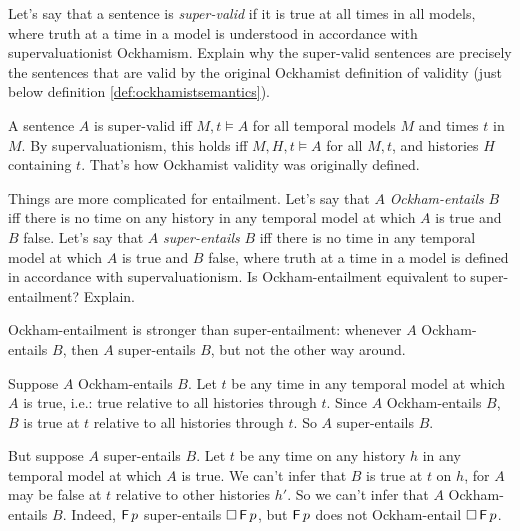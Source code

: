 \begin{exercise}
  Let's say that a sentence is \emph{super-valid} if it is true at all times in
  all models, where truth at a time in a model is understood in accordance with
  supervaluationist Ockhamism. Explain why the super-valid sentences are
  precisely the sentences that are valid by the original Ockhamist definition of
  validity (just below definition \ref{def:ockhamistsemantics}).
\end{exercise}
\begin{solution}
  A sentence $A$ is super-valid iff $M,t \models A$ for all temporal models $M$
  and times $t$ in $M$. By supervaluationism, this holds iff $M,H,t \models A$
  for all $M,t$, and histories $H$ containing $t$. That's how Ockhamist validity was originally defined.
\end{solution}
\vspace{-2mm}
\begin{exercise}
  Things are more complicated for entailment. Let's say that $A$
  \emph{Ockham-entails} $B$ iff there is no time on any history in any temporal
  model at which $A$ is true and $B$ false. Let's say that $A$
  \emph{super-entails} $B$ iff there is no time in any temporal model at which
  $A$ is true and $B$ false, where truth at a time in a model is defined in
  accordance with supervaluationism. Is Ockham-entailment equivalent to
  super-entailment? Explain.
\end{exercise}
\begin{solution}
  Ockham-entailment is stronger than super-entailment: whenever $A$
  Ockham-entails $B$, then $A$ super-entails $B$, but not the other way around.

  Suppose $A$ Ockham-entails $B$. Let $t$ be any time in any temporal model at
  which $A$ is true, i.e.: true relative to all histories through $t$. Since $A$
  Ockham-entails $B$, $B$ is true at $t$ relative to all histories through
  $t$. So $A$ super-entails $B$.

  But suppose $A$ super-entails $B$. Let $t$ be any time on any history $h$ in
  any temporal model at which $A$ is true. We can't infer that $B$ is true at
  $t$ on $h$, for $A$ may be false at $t$ relative to other histories $h'$. So
  we can't infer that $A$ Ockham-entails $B$. Indeed, $\operatorname{\mathsf{F}} p$ super-entails
  $\Box \operatorname{\mathsf{F}} p$, but $\operatorname{\mathsf{F}} p$ does not Ockham-entail $\Box \operatorname{\mathsf{F}} p$.
\end{solution}



